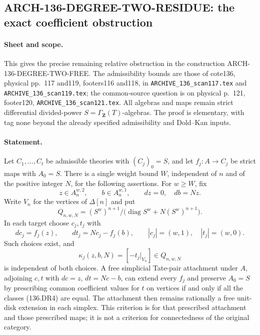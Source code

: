 \subsection{ARCH-136-DEGREE-TWO-RESIDUE: the exact coefficient obstruction}
\label{sec:136degree2residue}

\paragraph{Sheet and scope.}
This gives the precise remaining relative obstruction in the construction
ARCH-136-DEGREE-TWO-FREE. The admissibility bounds are those of cote136,
physical pp.~117 and119, footers116 and118, in
\texttt{ARCHIVE\_136\_scan117.tex} and
\texttt{ARCHIVE\_136\_scan119.tex}; the common-source question is on
physical p.~121, footer120, \texttt{ARCHIVE\_136\_scan121.tex}.
All algebras and maps remain strict differential divided-power
$S=\Gamma_{\mathbf Z}(T)$-algebras. The proof is elementary, with tag
none beyond the already specified admissibility and Dold--Kan inputs.

\paragraph{Statement.}
Let $C_1,\ldots,C_t$ be admissible theories with $(C_j)_0=S$,
and let $f_j:A\to C_j$ be strict maps with $A_0=S$.
There is a single weight bound $W$, independent of $n$ and of the
positive integer $N$, for the following assertions.
For $w\geq W$, fix
\[
 z\in A_n^{w,2},\qquad b\in A_n^{w,1},\qquad
                    dz=0,\quad db=Nz.                 \tag{136.DR1}
\]
Write $V_n$ for the vertices of $\Delta[n]$ and put
\[
 Q_{n,w,N}=(S^w)^{n+1}/
              \bigl(\operatorname{diag}S^w+N(S^w)^{n+1}\bigr).
                                                               \tag{136.DR2}
\]
In each target choose $c_j,t_j$ with
\[
 dc_j=f_j(z),\qquad dt_j=Nc_j-f_j(b),
              \qquad |c_j|=(w,1),\quad |t_j|=(w,0).
                                                               \tag{136.DR3}
\]
Such choices exist, and
\[
                 \kappa_j(z,b,N)=[-t_j|_{V_n}]
                           \in Q_{n,w,N}                \tag{136.DR4}
\]
is independent of both choices. A free simplicial Tate-pair
attachment under $A$, adjoining $c,t$ with
$dc=z$, $dt=Nc-b$, can extend every $f_j$ and preserve $A_0=S$
by prescribing common coefficient values for $t$ on vertices
if and only if all the classes (136.DR4) are equal.
The attachment then remains rationally a free unit-disk extension
in each simplex. This criterion is for that prescribed attachment
and those prescribed maps; it is not a criterion for connectedness
of the original category.

